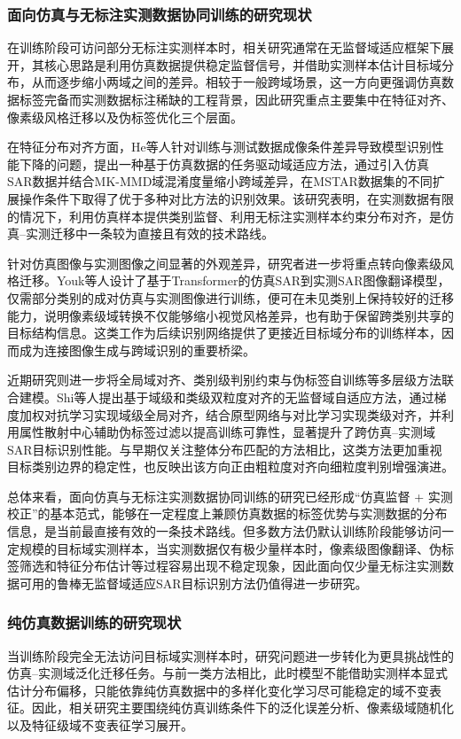 \subsubsection{面向仿真与无标注实测数据协同训练的研究现状}
在训练阶段可访问部分无标注实测样本时，相关研究通常在无监督域适应框架下展开，其核心思路是利用仿真数据提供稳定监督信号，并借助实测样本估计目标域分布，从而逐步缩小两域之间的差异。相较于一般跨域场景，这一方向更强调仿真数据标签完备而实测数据标注稀缺的工程背景，因此研究重点主要集中在特征对齐、像素级风格迁移以及伪标签优化三个层面。

在特征分布对齐方面，He等人\cite{he2021sar}针对训练与测试数据成像条件差异导致模型识别性能下降的问题，提出一种基于仿真数据的任务驱动域适应方法，通过引入仿真SAR数据并结合MK-MMD域混淆度量缩小跨域差异，在MSTAR数据集的不同扩展操作条件下取得了优于多种对比方法的识别效果。该研究表明，在实测数据有限的情况下，利用仿真样本提供类别监督、利用无标注实测样本约束分布对齐，是仿真--实测迁移中一条较为直接且有效的技术路线。

针对仿真图像与实测图像之间显著的外观差异，研究者进一步将重点转向像素级风格迁移。Youk等人\cite{youk2023transformer}设计了基于Transformer的仿真SAR到实测SAR图像翻译模型，仅需部分类别的成对仿真与实测图像进行训练，便可在未见类别上保持较好的迁移能力，说明像素级域转换不仅能够缩小视觉风格差异，也有助于保留跨类别共享的目标结构信息。这类工作为后续识别网络提供了更接近目标域分布的训练样本，因而成为连接图像生成与跨域识别的重要桥梁。

近期研究则进一步将全局域对齐、类别级判别约束与伪标签自训练等多层级方法联合建模。Shi等人\cite{shi2024unsupervised}提出基于域级和类级双粒度对齐的无监督域自适应方法，通过梯度加权对抗学习实现域级全局对齐，结合原型网络与对比学习实现类级对齐，并利用属性散射中心辅助伪标签过滤以提高训练可靠性，显著提升了跨仿真--实测域SAR目标识别性能。与早期仅关注整体分布匹配的方法相比，这类方法更加重视目标类别边界的稳定性，也反映出该方向正由粗粒度对齐向细粒度判别增强演进。

总体来看，面向仿真与无标注实测数据协同训练的研究已经形成“仿真监督 + 实测校正”的基本范式，能够在一定程度上兼顾仿真数据的标签优势与实测数据的分布信息，是当前最直接有效的一条技术路线。但多数方法仍默认训练阶段能够访问一定规模的目标域实测样本，当实测数据仅有极少量样本时，像素级图像翻译、伪标签筛选和特征分布估计等过程容易出现不稳定现象，因此面向仅少量无标注实测数据可用的鲁棒无监督域适应SAR目标识别方法仍值得进一步研究。

\subsubsection{纯仿真数据训练的研究现状}
当训练阶段完全无法访问目标域实测样本时，研究问题进一步转化为更具挑战性的仿真--实测域泛化迁移任务。与前一类方法相比，此时模型不能借助实测样本显式估计分布偏移，只能依靠纯仿真数据中的多样化变化学习尽可能稳定的域不变表征。因此，相关研究主要围绕纯仿真训练条件下的泛化误差分析、像素级域随机化以及特征级域不变表征学习展开。

